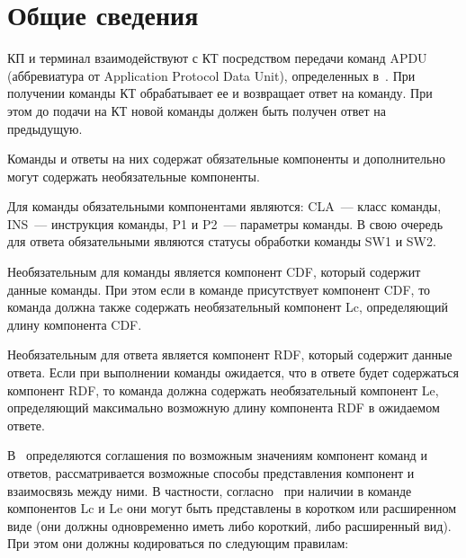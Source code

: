 \section{Общие сведения}\label{CMDS.Intro}

КП и терминал взаимодействуют с КТ посредством передачи команд APDU 
(аббревиатура от Application Protocol Data Unit), определенных в~\cite{APDU}. 
При получении команды КТ обрабатывает ее и возвращает ответ на команду. При 
этом до подачи на КТ новой команды должен быть получен ответ на 
предыдущую. 

Команды и ответы на них содержат обязательные компоненты и дополнительно 
могут содержать необязательные компоненты.  

Для команды обязательными компонентами являются: CLA~--- класс команды, 
INS~--- инструкция команды, P1 и P2~--- параметры команды. В свою очередь для 
ответа обязательными являются статусы обработки команды SW1 и SW2.  

Необязательным для команды является компонент CDF, который содержит данные 
команды. При этом если в команде присутствует компонент CDF, то команда 
должна также содержать необязательный компонент Lc, определяющий длину 
компонента CDF. 

Необязательным для ответа является компонент RDF, который содержит данные 
ответа. Если при выполнении команды ожидается, что в ответе будет 
содержаться компонент RDF, то команда должна содержать необязательный 
компонент Le, определяющий максимально возможную длину компонента RDF в 
ожидаемом ответе. 

В~\cite{APDU} определяются соглашения по возможным значениям компонент команд и 
ответов, рассматривается возможные способы представления компонент и 
взаимосвязь между ними. В частности, согласно~\cite{APDU} при наличии в команде 
компонентов Lc и Le они могут быть представлены в коротком или расширенном 
виде (они должны одновременно иметь либо короткий, либо расширенный вид). 
При этом они должны кодироваться по следующим правилам: 


